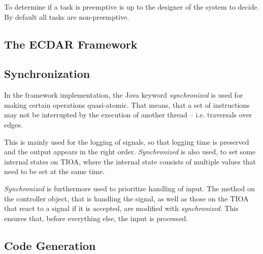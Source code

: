 To determine if a task is preemptive is up to the designer of the
system to decide. By default all tasks are non-preemptive.

\subsection{The ECDAR Framework}
\label{implementation-framework}




\subsection{Synchronization}
\label{subsec:synch}

In the framework implementation, the Java keyword \textit{synchronized} is 
used for making certain operations quasi-atomic. That means, that a set of
instructions may not be interrupted by the execution of another thread -- 
i.e. traversals over edges.

This is mainly used for the logging of signals, so that logging time
is preserved and the output appears in the right order. \textit{Synchronized}
is also used, to set some internal states on TIOA, where the internal state
consists of multiple values that need to be set at the same time.

\textit{Synchronized} is furthermore used to prioritize handling of input.  The
method on the controller object, that is handling the signal, as well as those
on the TIOA that react to a signal if it is accepted, are modified with
\textit{synchronized}. This ensures that, before everything else, the input is
processed.


\subsection{Code Generation}
\label{implementation-code-generation}


